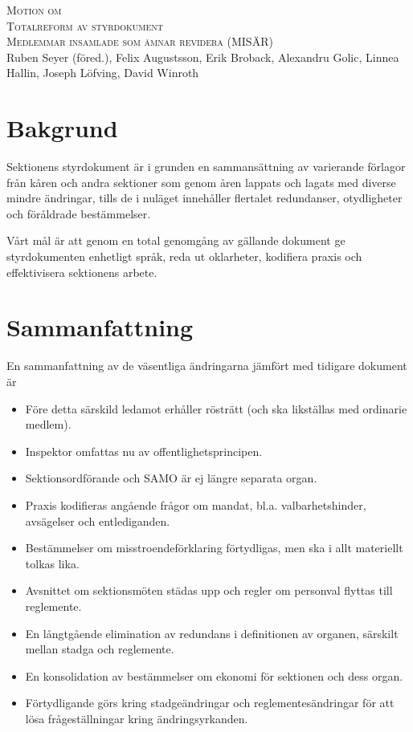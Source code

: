 \documentclass{article}
\newcommand{\motionsnamn}{Totalreform av styrdokument}
\newcommand{\motionar}{Medlemmar insamlade som ämnar revidera (MISÄR)}
\begin{document}
\begin{center}
\textsc{\Huge Motion om}\\[0.5cm]
\textsc{\huge \motionsnamn}\\[0.5cm]
\textsc{\large \motionar\\}
Ruben Seyer (föred.),
Felix Augustsson,
Erik Broback,
Alexandru Golic,
Linnea Hallin,
Joseph Löfving,
David Winroth
\end{center}

\section*{Bakgrund}
Sektionens styrdokument är i grunden en sammansättning av varierande förlagor från kåren och andra sektioner som genom åren lappats och lagats med diverse mindre ändringar, tills de i nuläget innehåller flertalet redundanser, otydligheter och föråldrade bestämmelser.

Vårt mål är att genom en total genomgång av gällande dokument ge styrdokumenten enhetligt språk, reda ut oklarheter, kodifiera praxis och effektivisera sektionens arbete.

\section*{Sammanfattning}
En sammanfattning av de väsentliga ändringarna jämfört med tidigare dokument är
\begin{itemize}
    \item Före detta särskild ledamot erhåller rösträtt (och ska likställas med ordinarie medlem).
    \item Inspektor omfattas nu av offentlighetsprincipen.
    \item Sektionsordförande och SAMO är ej längre separata organ.
    \item Praxis kodifieras angående frågor om mandat, bl.a. valbarhetshinder, avsägelser och entlediganden.
    \item Bestämmelser om misstroendeförklaring förtydligas, men ska i allt materiellt tolkas lika.
    \item Avsnittet om sektionsmöten städas upp och regler om personval flyttas till reglemente.
    \item En långtgående elimination av redundans i definitionen av organen, särskilt mellan stadga och reglemente.
    \item En konsolidation av bestämmelser om ekonomi för sektionen och dess organ.
    \item Förtydligande görs kring stadgeändringar och reglementesändringar för att lösa frågeställningar kring ändringsyrkanden.
\end{itemize}    
\end{document}

